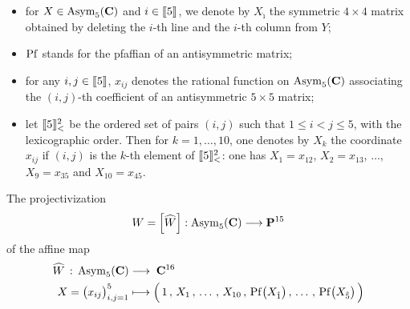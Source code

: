 \documentclass[11pt]{amsart}
\newcommand{\sk}{\smallskip}
\begin{document}
 \begin{itemize}
 \item[$-$]  for $X \in {\rm Asym}_5(\mathbf C)$ and $i\in  [\hspace{-0,05cm}[5]\hspace{-0,05cm}]$, we denote by $X_{\hat \imath}$ the symmetric $4\times 4$ matrix obtained by deleting the $i$-th line and the $i$-th column from $Y$;
 \sk
  \item[$-$] ${\rm Pf}$ stands for the pfaffian of an antisymmetric matrix;
  \sk
   \item[$-$] for any $i,j\in  [\hspace{-0,05cm}[5]\hspace{-0,05cm}]$, $x_{ij}$ denotes the rational function on ${\rm Asym}_5(\mathbf C)$ associating the $(i,j)$-th coefficient of an  antisymmetric $5\times 5$ matrix; 
   \sk
     \item[$-$] %
       let 
     $ [\hspace{-0,05cm}[5]\hspace{-0,05cm}]_<^2$  be the ordered set of pairs $(i,j)$ such that 
     $1\leq i<j\leq 5$, with the lexicographic order. 
      Then for $k=1,\ldots,10$, one denotes by $X_k$ the coordinate $x_{ij}$ 
     if $(i,j)$ is the $k$-th element of $ [\hspace{-0,05cm}[5]\hspace{-0,05cm}]_<^2$: one has 
    $X_1=x_{12}$, $X_2=x_{13}$, $\ldots$, %
    $X_9=x_{35}$ and    $X_{10}=x_{45}$. 
     \end{itemize}  
  The projectivization 
\begin{align}
\label{Eq:map-W-proj} W =\Big[ \widehat{W} \Big] : {\rm Asym}_5(\mathbf C)  \longrightarrow \mathbf P^{15}
\end{align}
 of the affine map 
\begin{align}
\label{Eq:map-W}
\widehat{W} \, : \, {\rm Asym}_5(\mathbf C) & \longrightarrow \; {\mathbf C}^{16}\\
X=
\big(x_{ij}\big)_{i,j=1}^5 & \longmapsto \Big( \, 1 \, , \, X_1\,  , \, \ldots \, , \,  X_{10}
\, ,\, 
{\rm Pf}\big( X_{\hat 1}\big) 
\,  , \, \ldots \, , \, {\rm Pf}\big( X_{\hat 5}\big)\,  \Big)
\nonumber
\end{align}
\end{document}

